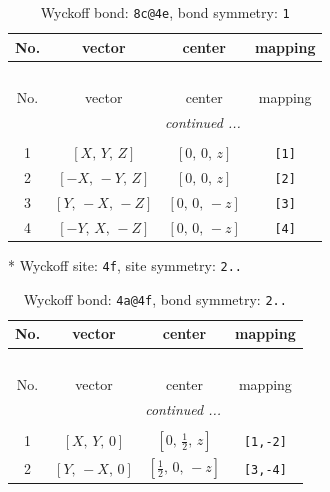 \documentclass[fleqn,8pt]{jsarticle}
\begin{document}
\begin{longtable}{cccc}
\caption{Wyckoff bond: {\tt 8c@4e}, bond symmetry: {\tt 1}}
 \\
 \hline \hline
No. & vector & center & mapping \\ \hline \endfirsthead

\multicolumn{3}{l}{\tablename\ \thetable{}} \\
 \hline \hline
No. & vector & center & mapping \\ \hline \endhead

 \hline \hline
\multicolumn{3}{r}{\footnotesize\it continued ...} \\ \endfoot

 \hline \hline
\multicolumn{3}{r}{} \\ \endlastfoot

1 & $\left[ X,\, Y,\, Z \right]$ & $\left[ 0,\, 0,\, z \right]$ & {\tt [1]} \\ \hline
2 & $\left[ - X,\, - Y,\, Z \right]$ & $\left[ 0,\, 0,\, z \right]$ & {\tt [2]} \\ \hline
3 & $\left[ Y,\, - X,\, - Z \right]$ & $\left[ 0,\, 0,\, - z \right]$ & {\tt [3]} \\ \hline
4 & $\left[ - Y,\, X,\, - Z \right]$ & $\left[ 0,\, 0,\, - z \right]$ & {\tt [4]} \\
\end{longtable}
* Wyckoff site: {\tt 4f}, site symmetry: {\tt 2..}
\renewcommand{\arraystretch}{1.2}
\begin{longtable}{cccc}
\caption{Wyckoff bond: {\tt 4a@4f}, bond symmetry: {\tt 2..}}
 \\
 \hline \hline
No. & vector & center & mapping \\ \hline \endfirsthead

\multicolumn{3}{l}{\tablename\ \thetable{}} \\
 \hline \hline
No. & vector & center & mapping \\ \hline \endhead

 \hline \hline
\multicolumn{3}{r}{\footnotesize\it continued ...} \\ \endfoot

 \hline \hline
\multicolumn{3}{r}{} \\ \endlastfoot

1 & $\left[ X,\, Y,\, 0 \right]$ & $\left[ 0,\, \frac{1}{2},\, z \right]$ & {\tt [1,-2]} \\ \hline
2 & $\left[ Y,\, - X,\, 0 \right]$ & $\left[ \frac{1}{2},\, 0,\, - z \right]$ & {\tt [3,-4]} \\
\end{longtable}
\end{document}

